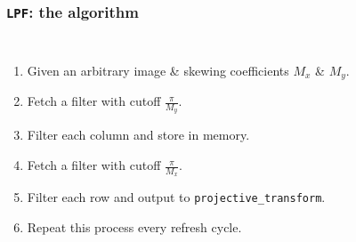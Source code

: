 \documentclass{beamer}
\begin{document}
\begin{frame}
	\frametitle{{\tt LPF}: the algorithm}
	\begin{columns}[t]
		\begin{enumerate}
		\item<1-> Given an arbitrary image \& skewing coefficients \( M_x \) \& \( M_y \).
		\item<2-> Fetch a filter with cutoff \( \frac{\pi}{M_y} \).
		\item<3-> Filter each column and store in memory.
		\item<4-> Fetch a filter with cutoff \( \frac{\pi}{M_x} \).
		\item<5-> Filter each row and output to {\tt projective\_transform}.
		\item<6-> Repeat this process every refresh cycle.
		\end{enumerate}


\end{columns}
\end{frame}
\end{document}
